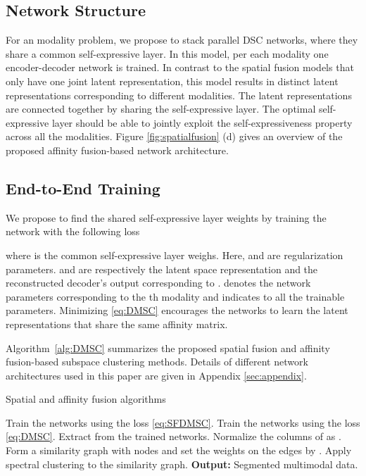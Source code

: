 \documentclass[journal]{IEEEtran}
\begin{document}
\subsection{Network Structure}
For an  modality problem, we propose to stack  parallel DSC networks, where they share a common self-expressive layer.		 In this model, per each modality one encoder-decoder network is trained.		In contrast to the spatial fusion models that only have one joint latent representation,  this model results in  distinct latent representations corresponding to  different modalities.		 The latent representations are connected together by sharing the self-expressive layer.		 The optimal self-expressive layer should be able to jointly exploit the self-expressiveness property across all the  modalities.		   Figure \ref{fig:spatialfusion} (d) gives an overview of the proposed affinity fusion-based network architecture.

\subsection{End-to-End Training}
 We propose to find the shared self-expressive layer weights by training the network with the following loss 

where  is the common self-expressive layer weighs.	Here,  and  are regularization parameters.   and   are respectively the latent space representation and the reconstructed decoder's output corresponding to .		     denotes the network parameters corresponding to the th modality and  indicates to all the trainable parameters.  Minimizing \eqref{eq:DMSC} encourages the networks to learn the latent representations that share the same affinity matrix.	

Algorithm~\ref{alg:DMSC} summarizes the proposed spatial fusion and affinity fusion-based subspace clustering methods.	Details of different network architectures used in this paper are given in Appendix \ref{sec:appendix}. 

\begin{algorithm}[t]
\caption{Spatial and affinity fusion algorithms}\label{alg:DMSC}
\begin{algorithmic}[1]
\State Train the networks using the loss \eqref{eq:SFDMSC}.
\State Train the networks using the loss \eqref{eq:DMSC}.
\EndIf
\State Extract  from the trained networks.
 \State Normalize the columns of  as .
\State Form a similarity graph with  nodes and set the weights on the edges by .
\State Apply spectral clustering to the similarity graph.
\EndProcedure
\State \textbf{Output:} Segmented multimodal data.
 \end{algorithmic}
\end{algorithm}
\end{document}
